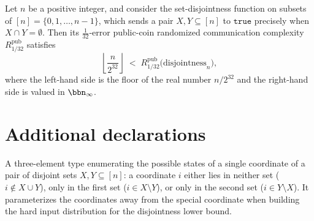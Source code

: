 \begin{theorem}
\label{CommunicationComplexity.Functions.Disjointness.RandomizedLowerBound.floor_div_pow_lt_publicCoin_communicationComplexity_disjointness}
\leanok
{}
Let $n$ be a positive integer, and consider the set-disjointness function on subsets of
$[n] = \{0, 1, \dots, n-1\}$, which sends a pair $X, Y \subseteq [n]$ to $\mathtt{true}$
precisely when $X \cap Y = \emptyset$. Then its $\tfrac{1}{32}$-error public-coin
randomized communication complexity $R^{\mathrm{pub}}_{1/32}$ satisfies
\[
\left\lfloor \frac{n}{2^{32}} \right\rfloor \;<\;
R^{\mathrm{pub}}_{1/32}\bigl(\mathrm{disjointness}_n\bigr),
\]
where the left-hand side is the floor of the real number $n / 2^{32}$ and the right-hand
side is valued in $\bbn_\infty$.
\end{theorem}

\section{Additional declarations}

\begin{definition}
\label{CommunicationComplexity.Functions.Disjointness.RandomizedLowerBound.DisjointCoordinate}
\leanok
A three-element type enumerating the possible states of a single coordinate of a
pair of disjoint sets $X, Y \subseteq [n]$: a coordinate $i$ either lies in neither
set ($i \notin X \cup Y$), only in the first set ($i \in X \setminus Y$), or only in
the second set ($i \in Y \setminus X$). It parameterizes the coordinates away from
the special coordinate when building the hard input distribution for the disjointness
lower bound.
\end{definition}
